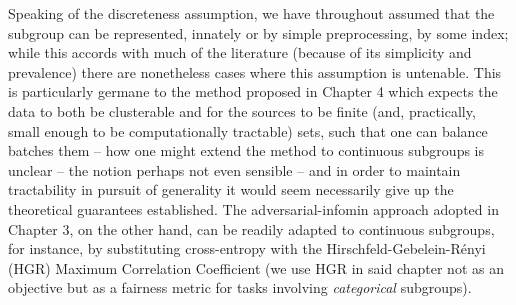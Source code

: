Speaking of the discreteness assumption, we have throughout assumed that the subgroup can be
represented, innately or by simple preprocessing, by some index; while this accords with much of
the literature (because of its simplicity and prevalence) there are nonetheless cases where this
assumption is untenable.
%
This is particularly germane to the method proposed in Chapter 4 which expects the data to both be
clusterable and for the sources to be finite (and, practically, small enough to be computationally
tractable) sets, such that one can balance batches \wrt{} them -- how one might extend the method
to continuous subgroups is unclear -- the notion perhaps not even sensible -- and in order to
maintain tractability in pursuit of generality it would seem necessarily give up the theoretical
guarantees established.
%
The adversarial-infomin approach adopted in Chapter 3, on the other hand, can be readily adapted to
continuous subgroups, for instance, by substituting cross-entropy with the
Hirschfeld-Gebelein-R\'enyi (HGR) Maximum Correlation Coefficient (we use HGR in said chapter not
as an objective but as a fairness metric for tasks involving \emph{categorical} subgroups).

